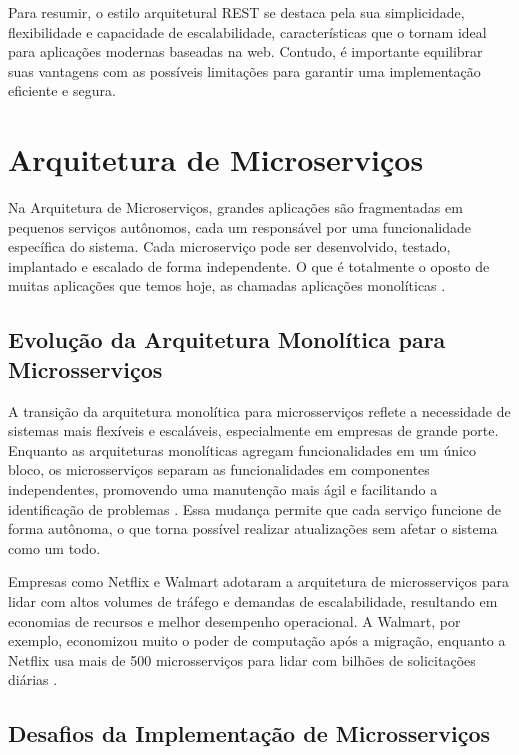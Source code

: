\documentclass[12pt]{article}
\begin{document}
	Para resumir, o estilo arquitetural REST se destaca pela sua simplicidade, flexibilidade e capacidade de escalabilidade, características que o tornam ideal para aplicações modernas baseadas na web. Contudo, é importante equilibrar suas vantagens com as possíveis limitações para garantir uma implementação eficiente e segura.

	
	\section{Arquitetura de Microserviços}
	
	Na Arquitetura de Microserviços, grandes aplicações são fragmentadas em pequenos serviços autônomos, cada um responsável por uma funcionalidade específica do sistema. Cada microserviço pode ser desenvolvido, testado, implantado e escalado de forma independente. O que é totalmente o oposto de muitas aplicações que temos hoje, as chamadas aplicações monolíticas \cite{newman2015}.
	
	
	\subsection{Evolução da Arquitetura Monolítica para Microsserviços}
	
	A transição da arquitetura monolítica para microsserviços reflete a necessidade de sistemas mais flexíveis e escaláveis, especialmente em empresas de grande porte. Enquanto as arquiteturas monolíticas agregam funcionalidades em um único bloco, os microsserviços separam as funcionalidades em componentes independentes, promovendo uma manutenção mais ágil e facilitando a identificação de problemas \cite{castro2021}. Essa mudança permite que cada serviço funcione de forma autônoma, o que torna possível realizar atualizações sem afetar o sistema como um todo.
	
	Empresas como Netflix e Walmart adotaram a arquitetura de microsserviços para lidar com altos volumes de tráfego e demandas de escalabilidade, resultando em economias de recursos e melhor desempenho operacional. A Walmart, por exemplo, economizou muito o poder de computação após a migração, enquanto a Netflix usa mais de 500 microsserviços para lidar com bilhões de solicitações diárias \cite{castro2021}.
	
	\subsection{Desafios da Implementação de Microsserviços}
	
\end{document}
